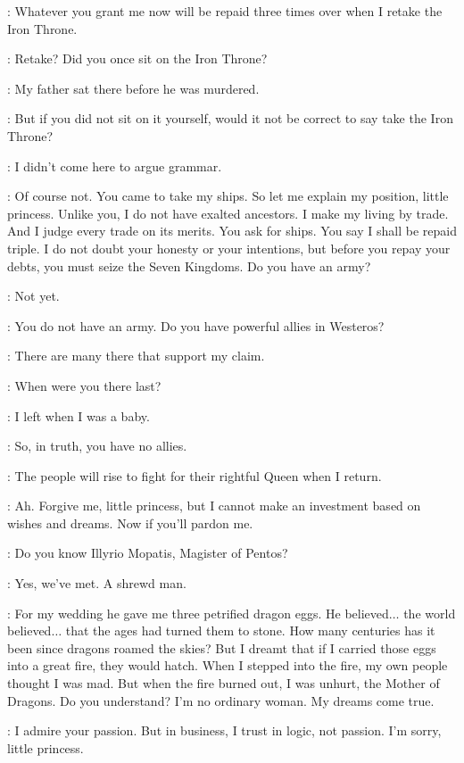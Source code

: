 \DAENERYS: Whatever you grant me now will be repaid three times over when I retake the Iron Throne. 

\SPICEKING: Retake? Did you once sit on the Iron Throne? 

\DAENERYS: My father sat there before he was murdered. 

\SPICEKING: But if you did not sit on it yourself, would it not be correct to say take the Iron Throne? 

\DAENERYS: I didn't come here to argue grammar. 

\SPICEKING: Of course not. You came to take my ships. So let me explain my position, little princess. Unlike you, I do not have exalted ancestors. I make my living by trade. And I judge every trade on its merits. You ask for ships. You say I shall be repaid triple. I do not doubt your honesty or your intentions, but before you repay your debts, you must seize the Seven Kingdoms. Do you have an army? 

\DAENERYS: Not yet. 

\SPICEKING: You do not have an army. Do you have powerful allies in Westeros? 

\DAENERYS: There are many there that support my claim. 

\SPICEKING: When were you there last? 

\DAENERYS: I left when I was a baby. 

\SPICEKING: So, in truth, you have no allies. 

\DAENERYS: The people will rise to fight for their rightful Queen when I return. 

\SPICEKING: Ah. Forgive me, little princess, but I cannot make an investment based on wishes and dreams. Now if you'll pardon me. 

\DAENERYS: Do you know Illyrio Mopatis, Magister of Pentos? 

\SPICEKING: Yes, we've met. A shrewd man. 

\DAENERYS: For my wedding he gave me three petrified dragon eggs. He believed$\ldots$ the world believed$\ldots$ that the ages had turned them to stone. How many centuries has it been since dragons roamed the skies? But I dreamt that if I carried those eggs into a great fire, they would hatch. When I stepped into the fire, my own people thought I was mad. But when the fire burned out, I was unhurt, the Mother of Dragons. Do you understand? I'm no ordinary woman. My dreams come true. 

\SPICEKING: I admire your passion. But in business, I trust in logic, not passion. I'm sorry, little princess. 

